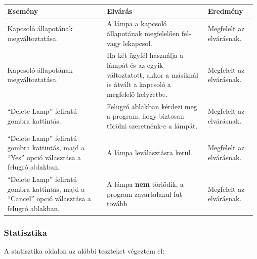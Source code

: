 \documentclass[a4paper,12pt]{report}
\begin{document}
\begin{center}
    \begin{tabular}{ | m{4.5cm} | m{4.5cm} | m{4.5cm} |}
        \hline
        Esemény & Elvárás & Eredmény \\ \hline
        Kapcsoló állapotának megváltoztatása. & A lámpa a kapcsoló állapotának megfelelően fel- vagy lekapcsol. & Megfelelt az elvárásnak. \\ \hline
        Kapcsoló állapotának megváltoztatása. & Ha két ügyfél használja a lámpát és az egyik változtatott, akkor a másiknál is átvált a kapcsoló a megfelelő
        helyzetbe. & Megfelelt az elvárásnak.\\ \hline
        ``Delete Lamp'' feliratú gombra kattintás. & Felugró ablakban kérdezi meg a program, hogy biztosan törölni szeretnénk-e a lámpát. & Megfelelt az elvárásnak. \\ \hline
        ``Delete Lamp'' feliratú gombra kattintás, majd a ``Yes'' opció választása a felugró ablakban. & A lámpa leválasztásra kerül. & Megfelelt az elvárásnak. \\ \hline
        ``Delete Lamp'' feliratú gombra kattintás, majd a ``Cancel'' opció választása a felugró ablakban. & A lámpa \textbf{nem} törlődik, a program zavartalanul fut tovább
        & Megfelelt az elvárásnak. \\ \hline
        \hline
    \end{tabular}
\end{center}

\subsubsection{Statisztika}
    A statisztika oldalon az alábbi teszteket végeztem el:
\end{document}
